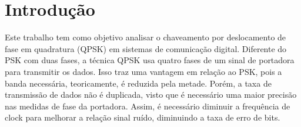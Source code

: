 \newpage
\section{Introdução}
Este trabalho tem como objetivo analisar o chaveamento por deslocamento de fase em quadratura (QPSK) em sistemas de comunicação digital. Diferente do PSK com duas fases, a técnica QPSK usa quatro fases de um sinal de portadora para transmitir os dados.  Isso traz uma vantagem em relação ao PSK, pois a banda necessária, teoricamente, é reduzida pela metade. Porém, a taxa de transmissão de dados não é duplicada, visto que é necessário uma maior precisão nas medidas de fase da portadora. Assim, é necessário diminuir a frequência de clock para melhorar a relação sinal ruído, diminuindo a taxa de erro de bits.

